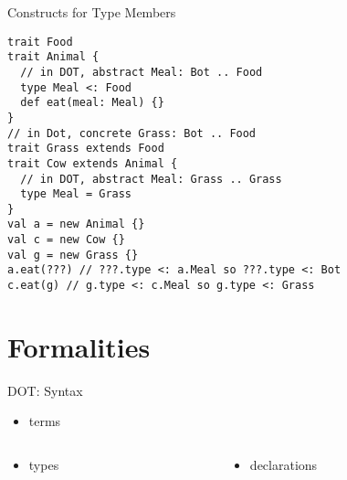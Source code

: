 \documentclass{beamer}
\begin{document}
\begin{frame}[fragile]{Constructs for Type Members}
\begin{verbatim}
trait Food
trait Animal {
  // in DOT, abstract Meal: Bot .. Food
  type Meal <: Food
  def eat(meal: Meal) {}
}
// in Dot, concrete Grass: Bot .. Food
trait Grass extends Food
trait Cow extends Animal {
  // in DOT, abstract Meal: Grass .. Grass
  type Meal = Grass
}
val a = new Animal {}
val c = new Cow {}
val g = new Grass {}
a.eat(???) // ???.type <: a.Meal so ???.type <: Bot
c.eat(g) // g.type <: c.Meal so g.type <: Grass
\end{verbatim}
\end{frame}

\section{Formalities}

\begin{frame}[fragile]{DOT: Syntax}
\begin{itemize}
\item terms
\end{itemize}
\begin{columns}
\begin{column}[t]{6cm}
\begin{itemize}
\item types
\end{itemize}
\end{column}
\begin{column}[t]{6cm}
\begin{itemize}
\item declarations
\end{itemize}
\end{column}
\end{columns}
\end{frame}
\end{document}
